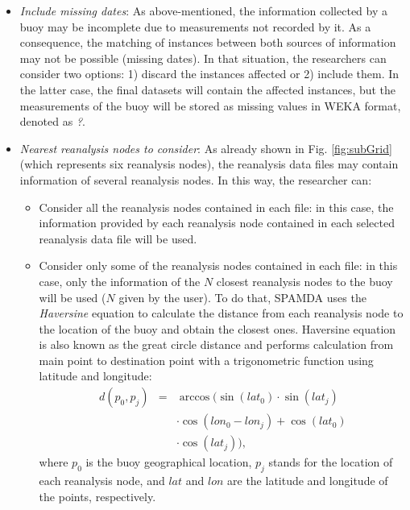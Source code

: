 \documentclass[review]{elsarticle}
\begin{document}
\begin{itemize}
					\item \textit{Include missing dates}: As above-mentioned, the information collected by a buoy may be incomplete due to measurements not recorded by it. As a consequence, the matching of instances between both sources of information may not be possible (missing dates). In that situation, the researchers can consider two options: 1) discard the instances affected or 2) include them. In the latter case, the final datasets will contain the affected instances, but the measurements of the buoy will be stored as missing values in WEKA format, denoted as \guillemotleft\textit{?}\guillemotright.
					
					\item \textit{Nearest reanalysis nodes to consider}: As already shown in Fig. \ref{fig:subGrid} (which represents six reanalysis nodes), the reanalysis data files may contain information of several reanalysis nodes. In this way, the researcher can:
					
						\begin{itemize}
							
							\item Consider all the reanalysis nodes contained in each file: in this case, the information provided by each reanalysis node contained in each selected reanalysis data file will be used.
							
							\item Consider only some of the reanalysis nodes contained in each file: in this case, only the information of the $N$ closest reanalysis nodes to the buoy will be used  ($N$ given by the user). To do that, SPAMDA uses the \textit{Haversine} equation \cite{Haversine_2009} to calculate the distance from each reanalysis node to the location of the buoy and obtain the closest ones. Haversine equation is also known as the great circle distance and performs calculation from main point to destination point with a trigonometric function using latitude and longitude:
								\begin{eqnarray}
									\label{eq:Haversine}
									d(p_0,p_j) & = & \arccos(\sin(lat_0)\cdot \sin(lat_j) \nonumber \\
									& & \cdot \cos(lon_0-lon_j) + \cos(lat_0) \\
									& & \cdot \cos(lat_j)), \nonumber 
								\end{eqnarray}								
							where $p_0$ is the buoy geographical location, $p_j$ stands for the location of each reanalysis node, and $lat$ and $lon$ are the latitude and longitude of the points, respectively.
						\end{itemize}
					

\end{itemize}
\end{document}
